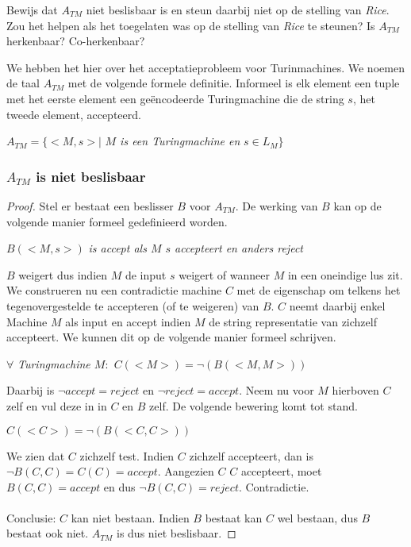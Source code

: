 \begin{quest}
	Bewijs dat $A_{TM}$ niet beslisbaar is en steun daarbij niet op de stelling van \textit{Rice}. Zou het helpen als het toegelaten was op de stelling van \textit{Rice} te steunen? Is $A_{TM}$ herkenbaar? Co-herkenbaar?
\end{quest}

We hebben het hier over het acceptatieprobleem voor Turinmachines. We noemen de taal $A_{TM}$ met de volgende formele definitie. Informeel is elk element een tuple met het eerste element een ge\"encodeerde Turingmachine die de string $s$, het tweede element, accepteerd.
\begin{center}
	$A_{TM} = \{ <M,s> |$ \textit{$M$ is een Turingmachine en} $ s \in L_M\}$
\end{center}

\subsubsection*{$A_{TM}$ is niet beslisbaar}
\begin{proof}
	Stel er bestaat een beslisser $B$ voor $A_{TM}$. De werking van $B$ kan op de volgende manier formeel gedefinieerd worden.

	\begin{pushcenter}
		$B(<M,s>)$ \textit{is accept als $M$ $s$ accepteert en anders reject}
	\end{pushcenter}

	$B$ weigert dus indien $M$ de input $s$ weigert of wanneer $M$ in een oneindige lus zit.
	We construeren nu een contradictie machine $C$ met de eigenschap om telkens het tegenovergestelde te accepteren (of te weigeren) van $B$. $C$ neemt daarbij enkel Machine $M$ als input en accept indien $M$ de string representatie van zichzelf accepteert. We kunnen dit op de volgende manier formeel schrijven.

	\begin{pushcenter}
		$\forall$ \textit{Turingmachine $M:$ $C(<M>) = \neg (B(<M,M>))$}
	\end{pushcenter}

	Daarbij is $\neg accept = reject$ en $\neg reject = accept$.  Neem nu voor $M$ hierboven $C$ zelf en vul deze in in $C$ en $B$ zelf. De volgende bewering komt tot stand.

	\begin{pushcenter}
		$C(<C>) = \neg (B(<C,C>))$
	\end{pushcenter}

	We zien dat $C$ zichzelf test. Indien $C$ zichzelf accepteert, dan is $\neg B(C,C) = C(C) = accept$. Aangezien $C$ $C$ accepteert, moet $B(C,C) = accept$ en dus $\neg B(C,C) = reject$. Contradictie.
	\\\\
	Conclusie: $C$ kan niet bestaan. Indien $B$ bestaat kan $C$ wel bestaan, dus $B$ bestaat ook niet. $A_{TM}$ is dus niet beslisbaar.
\end{proof}

